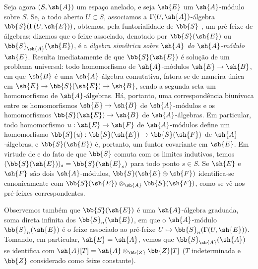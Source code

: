 \documentclass[oneside,10pt]{amsart}
\makeatletter
\newcommand{\ega@arrow}[2]{\mathchoice{#1}{#2}{#2}{#2}}
\let\ega@shortmapsto\mapsto
\renewcommand{\to}{\ega@arrow{\longrightarrow}{\rightarrow}}
\renewcommand{\mapsto}{\ega@arrow{\longmapsto}{\ega@shortmapsto}}
\newcommand{\oldpage}[2][]{\marginnote{\normalfont\footnotesize\textbf{#1}~|~#2}\ignorespaces}
\let\EGAOriginalLabel\label
\renewcommand{\label}[1]{\phantomsection\EGAOriginalLabel{#1}}
\makeatother
\begin{document}
\begin{env}[1.7.4]
\label{II.1.7.4}
Seja agora $(S,\sh{A})$ um espaço anelado, e seja $\sh{E}$ um $\sh{A}$-módulo sobre $S$.
Se, a todo aberto $U\subset S$, associamos a $\Gamma(U,\sh{A})$-álgebra $\bb{S}(\Gamma(U,\sh{E}))$, obtemos, pela funtorialidade de $\bb{S}$ , um pré-feixe de álgebras; dizemos que o feixe associado, denotado por $\bb{S}(\sh{E})$ ou $\bb{S}_\sh{A}(\sh{E})$, é a \emph{álgebra simétrica sobre $\sh{A}$ do $\sh{A}$-módulo $\sh{E}$}.
Resulta imediatamente de  que $\bb{S}(\sh{E})$ é solução de um problema universal: todo homomorfismo de $\sh{A}$-módulos $\sh{E}\to\sh{B}$, em que $\sh{B}$ é uma $\sh{A}$-álgebra comutativa, fatora-se de maneira única em $\sh{E}\to\bb{S}(\sh{E})\to\sh{B}$, sendo a segunda seta um homomorfismo de $\sh{A}$-álgebras.
Há, portanto, uma correspondência biunívoca entre os homomorfismos $\sh{E}\to\sh{B}$ de $\sh{A}$-módulos e os homomorfismos $\bb{S}(\sh{E})\to\sh{B}$ de $\sh{A}$-álgebras.
Em particular, todo homomorfismo $u:\sh{E}\to\sh{F}$ de $\sh{A}$-módulos define um homomorfismo $\bb{S}(u):\bb{S}(\sh{E})\to\bb{S}(\sh{F})$ de $\sh{A}$-álgebras, e $\bb{S}(\sh{E})$ é, portanto, um funtor covariante em $\sh{E}$.
\oldpage[II]{16}
Em virtude de  e do fato de que $\bb{S}$ comuta com os limites indutivos, temos $(\bb{S}(\sh{E}))_s=\bb{S}(\sh{E}_s)$ para todo ponto $s\in S$.
Se $\sh{E}$ e $\sh{F}$ são dois $\sh{A}$-módulos, $\bb{S}(\sh{E}\oplus\sh{F})$ identifica-se canonicamente com $\bb{S}(\sh{E})\otimes_\sh{A}\bb{S}(\sh{F})$, como se vê nos pré-feixes correspondentes.

Observemos também que $\bb{S}(\sh{E})$ é uma $\sh{A}$-álgebra graduada, soma direta infinita dos $\bb{S}_n(\sh{E})$, em que o $\sh{A}$-módulo $\bb{S}_n(\sh{E})$ é o feixe associado ao pré-feixe $U\mapsto\bb{S}_n(\Gamma(U,\sh{E}))$.
Tomando, em particular, $\sh{E}=\sh{A}$, vemos que $\bb{S}_\sh{A}(\sh{A})$ se identifica com $\sh{A}[T]=\sh{A}\otimes_\bb{Z}\bb{Z}[T]$ ($T$ indeterminada e $\bb{Z}$ considerado como feixe constante).
\end{env}
\end{document}
